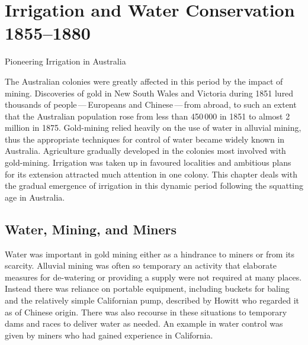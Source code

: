 
\setcounter{endnote}{0}

\chapter{Irrigation and Water Conservation 1855--1880}
\label{ch:emergence}
%
{Pioneering Irrigation in Australia}

The Australian colonies were greatly affected in this period by the
impact of mining.  Discoveries of gold in New South Wales and Victoria
during 1851 lured thousands of people\,---\,Europeans and Chinese\,---\,from
abroad, to such an extent that the Australian population rose from
less than 450\,000 in 1851 to almost 2 million in 1875.  Gold-mining
relied heavily on the use of water in alluvial mining, thus the
appropriate techniques for control of water became widely known in
Australia.  Agriculture gradually developed in the colonies most
involved with gold-mining.  Irrigation was taken up in favoured
localities and ambitious plans for its extension attracted much
attention in one colony.  This chapter deals with the gradual
emergence of irrigation in this dynamic period following the squatting
age in Australia.

\section*{Water, Mining, and Miners}

Water was important in gold mining either as a hindrance to miners or
from its scarcity.  Alluvial mining was often so temporary an activity
that elaborate measures for de-watering or providing a supply were not
required at many places.  Instead there was reliance on portable
equipment, including buckets for baling and the relatively simple
Californian pump, described by Howitt who regarded it as of Chinese
origin.  There was also recourse in these situations to temporary dams
and races to deliver water as needed.  An example in water control was
given by miners who had gained experience in
California.

